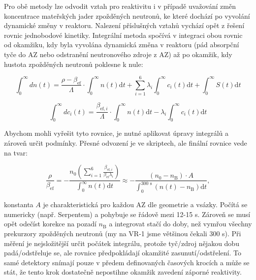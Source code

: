Pro obě metody lze odvodit vztah pro reaktivitu i v případě uvažování změn koncentrace mateřských jader zpožděných neutronů, ke které dochází po vyvolání dynamické změny v reaktoru. Nalezení příslušných vztahů vychází opět z řešení rovnic jednobodové kinetiky. Integrální metoda spočívá v integraci obou rovnic od okamžiku, kdy byla vyvolána dynamická změna v reaktoru (pád absorpční tyče do AZ nebo odstranění neutronového zdroje z AZ) až po okamžik, kdy hustota zpožděných neutronů poklesne k nule:

\begin{equation*}
    \int_0^\infty d n(t)= \dfrac{\rho - \beta_{\text{ef}}}{\Lambda}\cdot \int_0^\infty n(t) \text{d}t + \sum_{i=1}^6 \lambda_i \int_0^\infty c_i(t) \text{d}t + \int_0^\infty S(t) \text{d}t 
\end{equation*}

\begin{equation*}
    \int_0^\infty dc_i(t) = \frac{\beta_{\text{ef}, i}}{\Lambda}\cdot \int_0^\infty n(t) \text{d}t - \lambda_i \int_0^\infty c_i(t) \text{d}t
\end{equation*}

Abychom mohli vyřešit tyto rovnice, je nutné aplikovat úpravy integrálů a zároveň určit podmínky. Přesné odvození je ve skriptech, ale finální rovnice vede na tvar:

\begin{equation}
\boxed{ \frac{\rho}{\beta_{\text{ef}}} = -\frac{n_0 \left( \sum_{i=1}^6 \frac{\beta_{\text{ef},i}}{\beta_{\text{ef}} \lambda_i} \right)}{\int_0^\infty n(t) \text{d}t} \approx -\frac{(n_0-n_\text{B}) \cdot A}{\int_0^{300\text{ s}} \left( n(t)-n_\text{B}\right) \text{d}t},}
\end{equation}

konstanta $A$ je charakteristická pro každou AZ dle geometrie a vsázky. Počítá se numericky (např. Serpentem) a pohybuje se řádově mezi 12-15 s. Zároveň se musí opět odečíst korekce na pozadí $n_\text{B}$ a integrovat stačí do doby, než vymřou všechny prekurzory zpožděných neutronů (my na VR-1 jsme většinou čekali 300 s). Při měření je nejsložitější určit počátek integrálu, protože tyč/zdroj nějakou dobu padá/odstřeluje se, ale rovnice předpokládají okamžité zasunutí/odstřelení. To samé detektory snímají pouze v předem definovaných časových krocích a může se stát, že tento krok dostatečně nepostihne okamžik zavedení záporné reaktivity.

